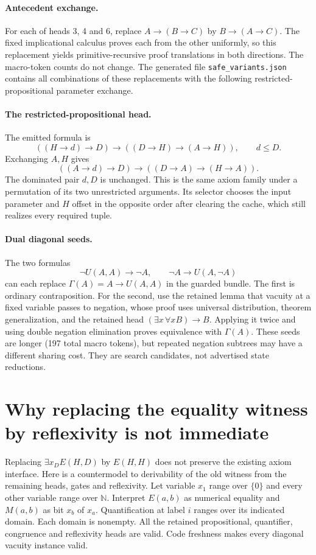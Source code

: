 \paragraph{Antecedent exchange.}
For each of heads 3, 4 and 6, replace $A\to(B\to C)$ by
$B\to(A\to C)$. The fixed implicational calculus proves each from the
other uniformly, so this replacement yields primitive-recursive proof
translations in both directions. The macro-token counts do not change.
The generated file \texttt{safe\_variants.json} contains all combinations
of these replacements with the following restricted-propositional
parameter exchange.

\paragraph{The restricted-propositional head.}
The emitted formula is
\[
 ((H\to d)\to D)\to((D\to H)\to(A\to H)),\qquad d\le D.
\]
Exchanging $A,H$ gives
\[
 ((A\to d)\to D)\to((D\to A)\to(H\to A)).
\]
The dominated pair $d,D$ is unchanged. This is the same axiom family
under a permutation of its two unrestricted arguments. Its selector
chooses the input parameter and $H$ offset in the opposite order after
clearing the cache, which still realizes every required tuple.

\paragraph{Dual diagonal seeds.}
The two formulas
\[
 \neg U(A,A)\to\neg A,
 \qquad
 \neg A\to U(A,\neg A)
\]
can each replace $\Gamma(A)=A\to U(A,A)$ in the guarded bundle.
The first is ordinary contraposition. For the second, use the retained
lemma that vacuity at a fixed variable passes to negation, whose proof
uses universal distribution, theorem generalization, and the retained
head $(\exists x\,\forall xB)\to B$. Applying it twice and using double
negation elimination proves equivalence with $\Gamma(A)$. These seeds
are longer (197 total macro tokens), but repeated negation subtrees
may have a different sharing cost. They are search candidates, not
advertised state reductions.

\section{Why replacing the equality witness by reflexivity is not immediate}
\label{app:reflexivity}

Replacing $\exists x_D E(H,D)$ by $E(H,H)$ does not preserve the
existing axiom interface. Here is a countermodel to derivability of the
old witness from the remaining heads, gates and reflexivity.
Let variable $x_1$ range over $\{0\}$ and every other variable range over
$\mathbb N$. Interpret $E(a,b)$ as numerical equality and $M(a,b)$ as
bit $x_b$ of $x_a$. Quantification at label $i$ ranges over its indicated
domain. Each domain is nonempty. All the retained propositional,
quantifier, congruence and reflexivity heads are valid. Code freshness
makes every diagonal vacuity instance valid.

